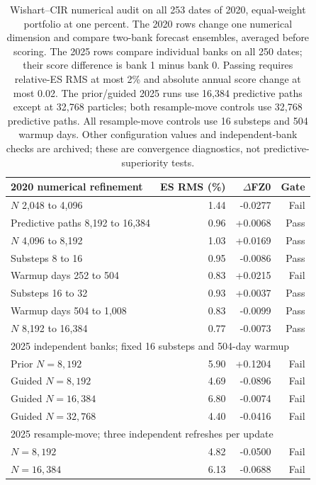 \documentclass[11pt]{article}
\theoremstyle{definition}\newtheorem{definition}[theorem]{Definition}
\theoremstyle{remark}\newtheorem{remark}[theorem]{Remark}
\begin{document}
\begin{table}[htbp]
\centering\small
\begin{tabular}{lrrr}\toprule
2020 numerical refinement & ES RMS (\%) & $\Delta$FZ0 & Gate \\ \midrule
$N$ 2,048 to 4,096 & 1.44 & -0.0277 & Fail \\
Predictive paths 8,192 to 16,384 & 0.96 & +0.0068 & Pass \\
$N$ 4,096 to 8,192 & 1.03 & +0.0169 & Pass \\
Substeps 8 to 16 & 0.95 & -0.0086 & Pass \\
Warmup days 252 to 504 & 0.83 & +0.0215 & Fail \\
Substeps 16 to 32 & 0.93 & +0.0037 & Pass \\
Warmup days 504 to 1,008 & 0.83 & -0.0099 & Pass \\
$N$ 8,192 to 16,384 & 0.77 & -0.0073 & Pass \\
\midrule\multicolumn{4}{l}{2025 independent banks; fixed 16 substeps and 504-day warmup} \\
Prior $N=8,192$ & 5.90 & +0.1204 & Fail \\
Guided $N=8,192$ & 4.69 & -0.0896 & Fail \\
Guided $N=16,384$ & 6.80 & -0.0074 & Fail \\
Guided $N=32,768$ & 4.40 & -0.0416 & Fail \\
\midrule\multicolumn{4}{l}{2025 resample-move; three independent refreshes per update} \\
$N=8,192$ & 4.82 & -0.0500 & Fail \\
$N=16,384$ & 6.13 & -0.0688 & Fail \\
\bottomrule\end{tabular}
\caption{Wishart--CIR numerical audit on all 253 dates of 2020, equal-weight portfolio at one percent. The 2020 rows change one numerical dimension and compare two-bank forecast ensembles, averaged before scoring. The 2025 rows compare individual banks on all 250 dates; their score difference is bank 1 minus bank 0. Passing requires relative-ES RMS at most 2\% and absolute annual score change at most 0.02. The prior/guided 2025 runs use 16,384 predictive paths except at 32,768 particles; both resample-move controls use 32,768 predictive paths. All resample-move controls use 16 substeps and 504 warmup days. Other configuration values and independent-bank checks are archived; these are convergence diagnostics, not predictive-superiority tests.}\label{tab:wc-filter}
\end{table}
\end{document}
